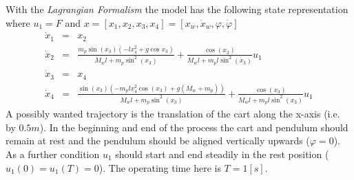 \documentclass[letterpaper,10pt,english]{sphinxmanual}
\begin{document}
With the \emph{Lagrangian Formalism} the model has the following state
representation where \(u_1 = F\) and
\(x = [x_1, x_2, x_3, x_4] = [x_w, \dot{x}_w, \varphi, \dot{\varphi}]\)
\begin{eqnarray*}
   \dot{x}_1 & = & x_2 \\
   \dot{x}_2 & = & \frac{m_p \sin(x_3)(-l x_4^2 + g \cos x_3)}{M_w l + m_p \sin^2(x_3)} + \frac{\cos(x_3)}{M_w l + m_p l \sin^2(x_3)} u_1 \\
   \dot{x}_3 & = & x_4 \\
   \dot{x}_4 & = & \frac{\sin(x_3)(-m_p l x_4^2 \cos(x_3) + g(M_w + m_p))}{M_w l + m_p \sin^2(x_3)} + \frac{\cos(x_3)}{M_w l + m_p l \sin^2(x_3)} u_1
\end{eqnarray*}
A possibly wanted trajectory is the translation of the cart along the
x-axis (i.e. by \(0.5m\)). In the beginning and end of the process
the cart and pendulum should remain at rest and the pendulum should be
aligned vertically upwards (\(\varphi = 0\)). As a further condition
\(u_1\) should start and end steadily in the rest position
(\(u_1(0) = u_1(T) = 0\)).
The operating time here is \(T = 1 [s]\).
\end{document}

